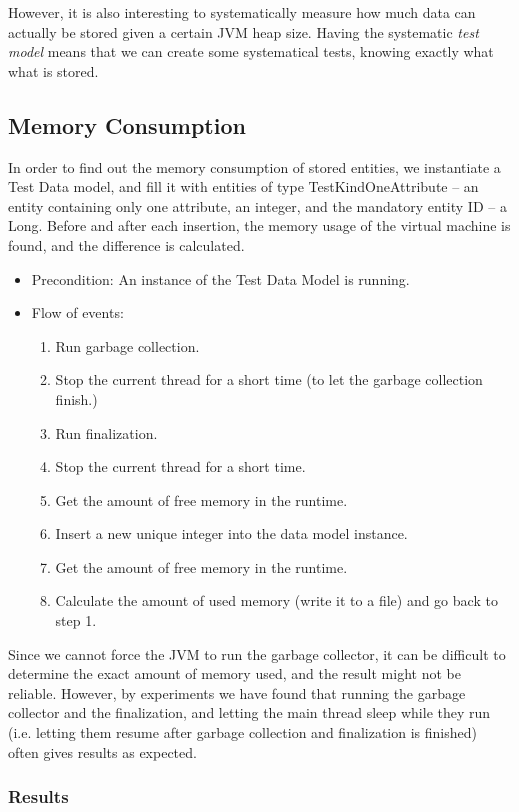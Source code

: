 However, it is also interesting to systematically measure how much
data can actually be stored given a certain JVM heap size. Having
the systematic \emph{test model} means that we can create some systematical
tests, knowing exactly what what is stored.


\subsection{Memory Consumption}

In order to find out the memory consumption of stored entities, we
instantiate a Test Data model, and fill it with entities of type TestKindOneAttribute
-- an entity containing only one attribute, an integer, and the mandatory
entity ID -- a Long. Before and after each insertion, the memory usage
of the virtual machine is found, and the difference is calculated.
\begin{itemize}
\item Precondition: An instance of the Test Data Model is running.
\item Flow of events:

\begin{enumerate}
\item Run garbage collection.
\item Stop the current thread for a short time (to let the garbage collection
finish.)
\item Run finalization.
\item Stop the current thread for a short time.
\item Get the amount of free memory in the runtime.
\item Insert a new unique integer into the data model instance.
\item Get the amount of free memory in the runtime.
\item Calculate the amount of used memory (write it to a file) and go back
to step 1.
\end{enumerate}
\end{itemize}
Since we cannot force the JVM to run the garbage collector, it can
be difficult to determine the exact amount of memory used, and the
result might not be reliable. However, by experiments we have found
that running the garbage collector and the finalization, and letting
the main thread sleep while they run (i.e. letting them resume after
garbage collection and finalization is finished) often gives results
as expected.


\subsubsection{Results}

